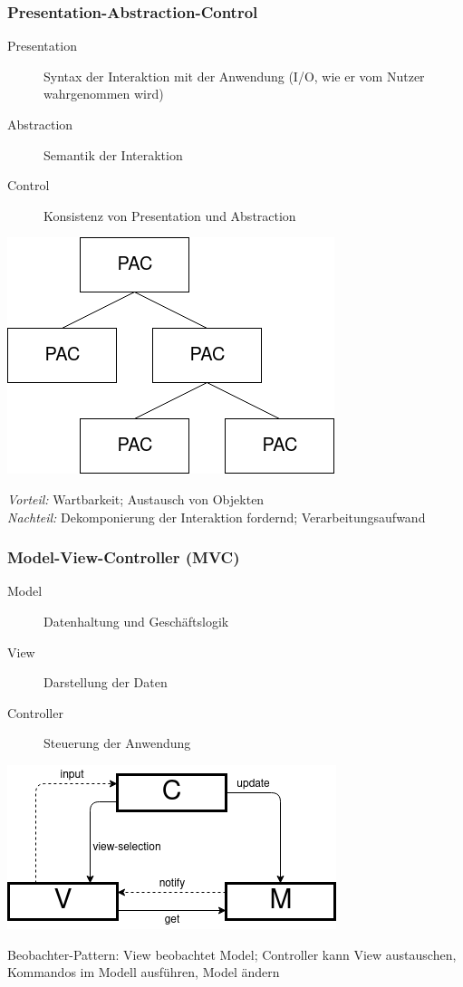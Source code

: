 \documentclass[8pt,a4paper,landscape]{extarticle}
\begin{document}
\begin{multicols*}{4}
	\subsubsection{Presentation-Abstraction-Control}
	\begin{description}
		\item[Presentation] Syntax der Interaktion mit der Anwendung
		      (I/O, wie er vom Nutzer wahrgenommen wird)
		\item[Abstraction] Semantik der Interaktion
		\item[Control]  Konsistenz von Presentation und Abstraction
	\end{description}
	\begin{center}
		\includegraphics[width=0.5\linewidth]{./pictures/figure_05.png}
	\end{center}
	\textit{Vorteil:} Wartbarkeit; Austausch von Objekten \\
	\textit{Nachteil:} Dekomponierung der Interaktion fordernd;
	Verarbeitungsaufwand
	\subsubsection{Model-View-Controller (MVC)}
	\begin{description}
		\item[Model] Datenhaltung und Geschäftslogik
		\item[View] Darstellung der Daten
		\item[Controller] Steuerung der Anwendung
	\end{description}
	\begin{center}
		\includegraphics[width=0.7\linewidth]{./pictures/figure_06.png}
	\end{center}
	Beobachter-Pattern: View beobachtet Model; Controller kann View austauschen,
	Kommandos im Modell ausführen, Model ändern

\end{multicols*}
\end{document}
